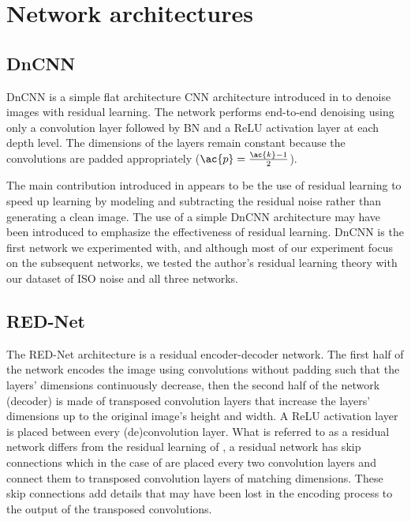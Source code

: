 \section{Network architectures}
\subsection{DnCNN}
DnCNN is a simple flat architecture \ac{CNN} architecture introduced in \cite{dncnn} to denoise images with residual learning. The network performs end-to-end denoising using only a convolution layer followed by \ac{BN} and a \ac{ReLU} activation layer at each depth level. The dimensions of the layers remain constant because the convolutions are padded appropriately ($\ac{p}={\ac{k}-1\over{2}}$). %

The main contribution introduced in \cite{dncnn} appears to be the use of residual learning to speed up learning by modeling and subtracting the residual noise rather than generating a clean image. The use of a simple DnCNN architecture may have been introduced to emphasize the effectiveness of residual learning. DnCNN is the first network we experimented with, and although most of our experiment focus on the subsequent networks, we tested the author's residual learning theory with our dataset of ISO noise and all three networks.
\subsection{RED-Net}
The \ac{RED-Net} architecture is a residual encoder-decoder network. The first half of the network encodes the image using convolutions without padding such that the layers' dimensions continuously decrease, then the second half of the network (decoder) is made of transposed convolution layers that increase the layers' dimensions up to the original image's height and width. A \ac{ReLU} activation layer is placed between every (de)convolution layer. What is referred to as a residual network differs from the residual learning of \cite{dncnn}, a residual network has skip connections which in the case of \cite{rednet} are placed every two convolution layers and connect them to transposed convolution layers of matching dimensions. These skip connections add details that may have been lost in the encoding process to the output of the transposed convolutions. 
